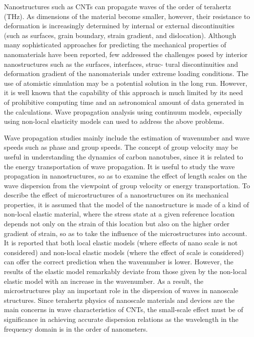 Nanostructures such as CNTs can propagate waves of the order of terahertz (THz). As dimensions of the material become smaller, however, their resistance to deformation is increasingly determined by internal or external discontinuities (such as surfaces, grain boundary, strain
gradient, and dislocation). Although many sophisticated approaches for predicting
the mechanical properties of nanomaterials have been reported, few addressed the
challenges posed by interior nanostructures such as the surfaces, interfaces, struc-
tural discontinuities and deformation gradient of the nanomaterials under extreme
loading conditions. The use of atomistic simulation may be a potential solution in
the long run. However, it is well known that the capability of this approach is much
limited by its need of prohibitive computing time and an astronomical amount of data
generated in the calculations. Wave propagation analysis using continuum models,
especially using non-local elasticity models can used to address the above problems.

Wave propagation studies mainly include the estimation of wavenumber and wave
speeds such as phase and group speeds. The concept of group velocity may be useful
in understanding the dynamics of carbon nanotubes, since it is related to the energy
transportation of wave propagation. It is useful to study the
wave propagation in nanostructures, so as to examine the effect of length scales on
the wave dispersion from the viewpoint of group velocity or energy transportation. To
describe the effect of microstructures of a nanostructures on its mechanical properties,
it is assumed that the model of the nanostructure is made of a kind of non-local elastic
material, where the stress state at a given reference location depends not only on the
strain of this location but also on the higher order gradient of strain, so as to take
the influence of the microstructures into account. It is reported that both local elastic
models (where effects of nano scale is not considered) and non-local elastic models
(where the effect of scale is considered) can offer the correct prediction when the
wavenumber is lower. However, the results of the elastic model remarkably deviate
from those given by the non-local elastic model with an increase in the wavenumber.
As a result, the microstructures play an important role in the dispersion of waves in
nanoscale structures. Since terahertz physics of nanoscale materials and devices are
the main concerns in wave characteristics of CNTs, the small-scale effect must be
of significance in achieving accurate dispersion relations as the wavelength in the
frequency domain is in the order of nanometers.\cite{gopalakrishnan2013wave}
